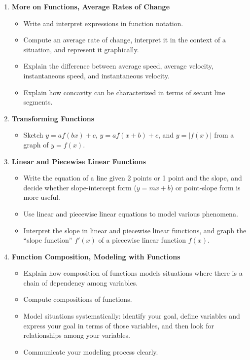 \documentclass{article}
\begin{document}
\begin{enumerate}
\item \textbf{More on Functions, Average Rates of Change} %
  \begin{itemize}

  \item Write and interpret expressions in function notation.

  \item Compute an average rate of change, interpret it in the context of a situation, and represent it graphically.

  \item Explain the difference between average speed, average velocity, instantaneous speed, and instantaneous velocity.

  \item Explain how concavity can be characterized in terms of secant line segments.

  \end{itemize}

\item \textbf{Transforming Functions} %
  \begin{itemize}
  \item Sketch $y = a f(bx) + c$, $y = a f(x + b) + c$, and $y = |f(x)|$
    from a graph of $y = f(x)$.

  \end{itemize}

\item \textbf{Linear and Piecewise Linear Functions} %
  \begin{itemize} 
  \item Write the equation of a line given 2 points or 1 point and the
    slope, and decide whether slope-intercept form ($y = mx + b$) or
    point-slope form is more useful. 

  \item Use linear and piecewise linear equations to model various
    phenomena.

  \item Interpret the slope in linear and piecewise linear functions, 
    and graph the ``slope function'' $f'(x)$ of a piecewise linear
    function $f(x)$.  

  \end{itemize}

\item \textbf{Function Composition, Modeling with Functions} %
  \begin{itemize}
  \item Explain how composition of functions models situations where there is a chain of dependency among variables.

  \item Compute compositions of functions.

  \item Model situations systematically: identify your goal, define variables and express your goal in terms of those variables, and then look for relationships among your variables.

  \item Communicate your modeling process clearly. 
  \end{itemize}
\end{enumerate}
\end{document}
